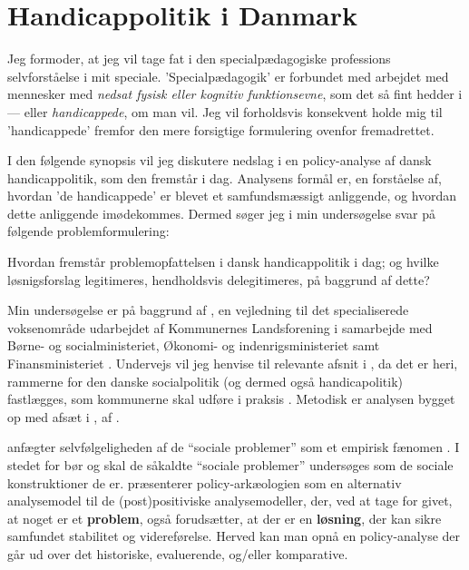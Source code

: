 \section{Handicappolitik i Danmark}

Jeg formoder, at jeg vil tage fat i den specialpædagogiske professions selvforståelse i mit speciale.
'Specialpædagogik' er forbundet med arbejdet med mennesker med \textit{nedsat fysisk eller kognitiv funktionsevne}, som det så fint hedder i  — eller \textit{handicappede}, om man vil. Jeg vil forholdsvis konsekvent holde mig til 'handicappede' fremfor den mere forsigtige formulering ovenfor fremadrettet.

I den følgende synopsis vil jeg diskutere nedslag i en policy-analyse af dansk handicappolitik, som den fremstår i dag.
Analysens formål er, en forståelse af, hvordan 'de handicappede' er blevet et samfundsmæssigt anliggende, og hvordan dette anliggende imødekommes.
Dermed søger jeg i min undersøgelse svar på følgende problemformulering:

Hvordan fremstår problemopfattelsen i dansk handicappolitik i dag; og hvilke løsnigsforslag legitimeres, hendholdsvis delegitimeres, på baggrund af dette?

Min undersøgelse er på baggrund af , en vejledning til det specialiserede voksenområde udarbejdet af Kommunernes Landsforening i samarbejde med Børne- og socialministeriet, Økonomi- og indenrigsministeriet samt Finansministeriet \autocite{klStyringAfDet2017}.
Undervejs vil jeg henvise til relevante afsnit i , da det er heri, rammerne for den danske socialpolitik (og dermed også handicapolitik) fastlægges, som kommunerne skal udføre i praksis \autocite[kapitel 2]{social-ogindenrigsministerietBekendtgorelseAfLov2019}. 
Metodisk er analysen bygget op med afsæt i , af \citeauthor{scheurichPolicyArchaeologyNew1994}.

\citeauthor{scheurichPolicyArchaeologyNew1994} anfægter selvfølgeligheden af de “sociale problemer” som et empirisk fænomen \autocite[s. ??]{scheurichPolicyArchaeologyNew1994}.
I stedet for bør og skal de såkaldte “sociale problemer” undersøges som de sociale konstruktioner de er.
\citeauthor{scheurichPolicyArchaeologyNew1994} præsenterer policy-arkæologien som en alternativ analysemodel til de (post)positiviske analysemodeller, der, ved at tage for givet, at noget er et \textbf{problem}, også forudsætter, at der er en \textbf{løsning}, der kan sikre samfundet stabilitet og videreførelse.
Herved kan man opnå en policy-analyse der går ud over det historiske, evaluerende, og/eller komparative.

